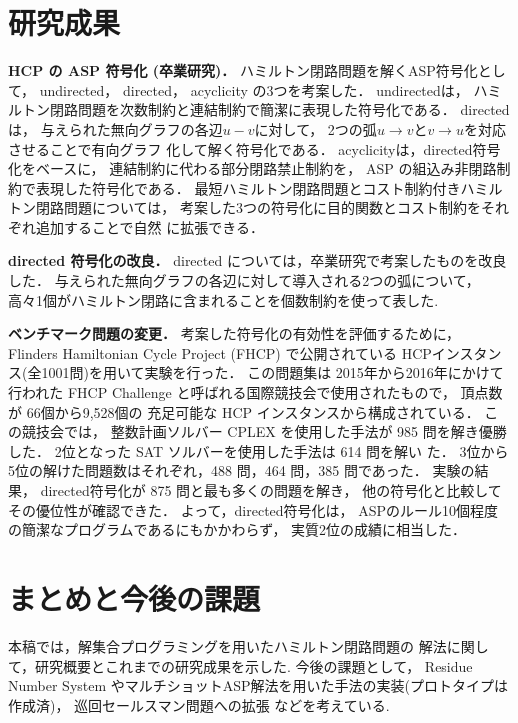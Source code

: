 \documentclass[a4j,10pt]{jarticle}
\begin{document}
\begin{multicols}{1}
\section{研究成果}
\textbf{HCP の ASP 符号化 (卒業研究)．}
ハミルトン閉路問題を解くASP符号化として，
\textsf{undirected}，
\textsf{directed}，
\textsf{acyclicity}
の3つを考案した．
\textsf{undirected}は，
ハミルトン閉路問題を次数制約と連結制約で簡潔に表現した符号化である．
\textsf{directed}は，
与えられた無向グラフの各辺$u-v$に対して，
2つの弧$u\rightarrow v$と$v\rightarrow u$を対応させることで有向グラフ
化して解く符号化である．
\textsf{acyclicity}は，\textsf{directed}符号化をベースに，
連結制約に代わる部分閉路禁止制約を，
ASP の組込み非閉路制約で表現した符号化である．
最短ハミルトン閉路問題とコスト制約付きハミルトン閉路問題については，
考案した3つの符号化に目的関数とコスト制約をそれぞれ追加することで自然
に拡張できる．

\textbf{directed 符号化の改良．}
\textsf{directed} については，卒業研究で考案したものを改良した．
与えられた無向グラフの各辺に対して導入される2つの弧について，
高々1個がハミルトン閉路に含まれることを個数制約を使って表した.

\textbf{ベンチマーク問題の変更．}
考案した符号化の有効性を評価するために，
Flinders Hamiltonian Cycle Project (FHCP) で公開されている
HCPインスタンス(全1001問)を用いて実験を行った．
この問題集は 2015年から2016年にかけて行われた 
FHCP Challenge と呼ばれる国際競技会で使用されたもので，
頂点数が 66個から9,528個の 充足可能な HCP インスタンスから構成されている．
この競技会では，
整数計画ソルバー CPLEX を使用した手法が 985
問を解き優勝した．
2位となった SAT ソルバーを使用した手法は 614 問を解い
た．
3位から5位の解けた問題数はそれぞれ，488 問，464 問，385 問であった．
実験の結果，
\textsf{directed}符号化が 875 問と最も多くの問題を解き，
他の符号化と比較してその優位性が確認できた．
よって，\textsf{directed}符号化は，
ASPのルール10個程度の簡潔なプログラムであるにもかかわらず，
実質2位の成績に相当した．

\section{まとめと今後の課題}
本稿では，解集合プログラミングを用いたハミルトン閉路問題の
解法に関して，研究概要とこれまでの研究成果を示した. 
今後の課題として，
Residue Number System やマルチショットASP解法を用いた手法の実装(プロトタイプは作成済)，
巡回セールスマン問題への拡張
などを考えている.


\end{multicols}
\end{document}
